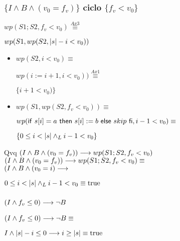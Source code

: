 \documentclass{article}
\begin{document}
\subsubsection*{$\{I \wedge B \wedge (v_{0} = f_{v})\}$ ciclo $\{f_{v} < v_{0}\}$}

$wp(S1;S2, f_{v}<v_{0}) \stackrel{Ax3}{\equiv}$

$wp(S1, wp(S2, |s|-i<v_{0}))$

\begin{itemize}
    \item $wp(S2, i<v_{0}) \equiv$
    
    $ wp(i:= i+1, i<v_{0})) \stackrel{Ax1}{\equiv}$

    $\{i+1<v_{0}) \}$

    \item $wp(S1, wp(S2, f_{v} < v_{0})) \equiv$

    $wp(\mathsf{if}\ s[i]=a\ \mathsf{then}\ s[i]:=b\ \mathsf{else}\ skip\ \mathsf{fi}, i-1<v_{0}) \equiv$

    $ \{ 0 \leq i < |s| \land _L i-1<v_{0} \}$

\end{itemize}

Qvq $(I \wedge B \wedge (v_{0} = f_{v})) \longrightarrow wp(S1;S2, f_{v} < v_{0})$ \\

$ (I \wedge B \wedge (v_{0} = f_{v})) \longrightarrow wp(S1;S2, f_{v} < v_{0}) \equiv$ \\

$ (I \wedge B \wedge (v_{0} = i)\longrightarrow$

$ 0 \leq i < |s| \land _L i-1<v_{0} \equiv \mathrm{true}$

\subsubsection*{$(I \wedge f_{v} \leq 0) \longrightarrow \neg B$}

$(I \wedge f_{v} \leq 0) \longrightarrow \neg B \equiv $

$I \wedge |s| - i \leq 0 \longrightarrow i \geq |s|\equiv \mathrm{true}$
\end{document}
